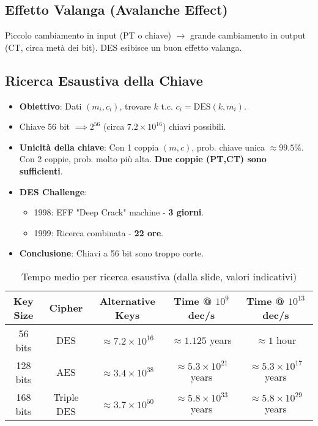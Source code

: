 \documentclass{article}
\begin{document}
\subsection{Effetto Valanga (Avalanche Effect)}
Piccolo cambiamento in input (PT o chiave) $\rightarrow$ grande cambiamento in output (CT, circa metà dei bit). DES esibisce un buon effetto valanga.

\subsection{Ricerca Esaustiva della Chiave}
\begin{itemize}
    \item \textbf{Obiettivo}: Dati $(m_i, c_i)$, trovare $k$ t.c. $c_i = \text{DES}(k, m_i)$.
    \item Chiave 56 bit $\implies 2^{56}$ (circa $7.2 \times 10^{16}$) chiavi possibili.
    \item \textbf{Unicità della chiave}: Con 1 coppia $(m,c)$, prob. chiave unica $\approx 99.5\%$. Con 2 coppie, prob. molto più alta. \textbf{Due coppie (PT,CT) sono sufficienti}.
    \item \textbf{DES Challenge}:
    \begin{itemize}
        \item 1998: EFF "Deep Crack" machine - \textbf{3 giorni}.
        \item 1999: Ricerca combinata - \textbf{22 ore}.
    \end{itemize}
    \item \textbf{Conclusione}: Chiavi a 56 bit sono troppo corte.
\end{itemize}

\begin{table}[H]
\centering
\caption{Tempo medio per ricerca esaustiva (dalla slide, valori indicativi)}
\begin{tabular}{|c|c|c|c|c|}
\hline
\textbf{Key Size} & \textbf{Cipher} & \textbf{Alternative Keys} & \textbf{Time @ $10^9$ dec/s} & \textbf{Time @ $10^{13}$ dec/s} \\ \hline
56 bits  & DES        & $\approx 7.2 \times 10^{16}$ & $\approx 1.125$ years & $\approx 1$ hour \\
128 bits & AES        & $\approx 3.4 \times 10^{38}$ & $\approx 5.3 \times 10^{21}$ years & $\approx 5.3 \times 10^{17}$ years \\
168 bits & Triple DES & $\approx 3.7 \times 10^{50}$ & $\approx 5.8 \times 10^{33}$ years & $\approx 5.8 \times 10^{29}$ years \\
\hline
\end{tabular}
\end{table}
\end{document}
